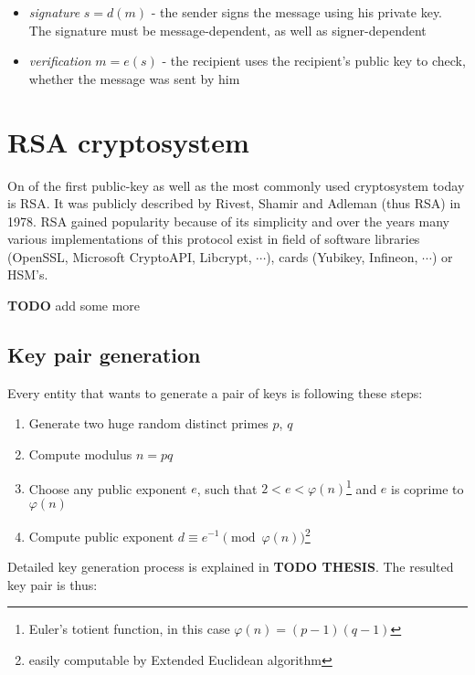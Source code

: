 \begin{itemize}

\item \textit{signature} $s = d(m)$ - the sender signs the message using his private key. The signature must be message-dependent, as well as signer-dependent

\item \textit{verification} $m = e(s)$ - the recipient uses the recipient's public key to check, whether the message was sent by him

\end{itemize}

\section{RSA cryptosystem}

On of the first public-key as well as the most commonly used cryptosystem today is RSA. It was publicly described by Rivest, Shamir and Adleman (thus RSA) in 1978\cite{RSA_paper}. RSA gained popularity because of its simplicity and over the years many various implementations of this protocol exist in field of software libraries (OpenSSL, Microsoft CryptoAPI, Libcrypt, $\cdots$), cards (Yubikey, Infineon, $\cdots$) or HSM's.

\textbf{TODO} add some more

\subsection*{Key pair generation}

Every entity that wants to generate a pair of keys is following these steps:

\begin{enumerate}

\item Generate two huge random distinct primes $p$, $q$
\item Compute modulus $n = pq$
\item Choose any public exponent $e$, such that $2 < e < \varphi(n)$\footnote{Euler's totient function, in this case $\varphi(n) = (p-1)(q-1)$} and $e$ is coprime to $\varphi(n)$
\item Compute public exponent $d \equiv e^{-1} \pmod{\varphi(n)}$\footnote{easily computable by Extended Euclidean algorithm}

\end{enumerate}

Detailed key generation process is explained in \textbf{TODO THESIS}. The resulted key pair is thus:

